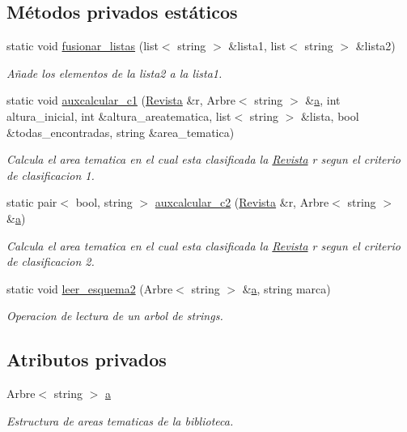 \subsection*{Métodos privados estáticos}
\begin{DoxyCompactItemize}
\item 
static void \hyperlink{class_esquema_abf74b66701d3ab70316d8740cdd0bc25}{fusionar\-\_\-listas} (list$<$ string $>$ \&lista1, list$<$ string $>$ \&lista2)
\begin{DoxyCompactList}\small\item\em Añade los elementos de la lista2 a la lista1. \end{DoxyCompactList}\item 
static void \hyperlink{class_esquema_a77210c8349dc7dccbaa8224c2da4e50e}{auxcalcular\-\_\-c1} (\hyperlink{class_revista}{Revista} \&r, Arbre$<$ string $>$ \&\hyperlink{class_esquema_aee89f1d564d1951112b2f10a47f943aa}{a}, int altura\-\_\-inicial, int \&altura\-\_\-areatematica, list$<$ string $>$ \&lista, bool \&todas\-\_\-encontradas, string \&area\-\_\-tematica)
\begin{DoxyCompactList}\small\item\em Calcula el area tematica en el cual esta clasificada la \hyperlink{class_revista}{Revista} r segun el criterio de clasificacion 1. \end{DoxyCompactList}\item 
static pair$<$ bool, string $>$ \hyperlink{class_esquema_a1e863b6bd93430abe836d339bd7bcba7}{auxcalcular\-\_\-c2} (\hyperlink{class_revista}{Revista} \&r, Arbre$<$ string $>$ \&\hyperlink{class_esquema_aee89f1d564d1951112b2f10a47f943aa}{a})
\begin{DoxyCompactList}\small\item\em Calcula el area tematica en el cual esta clasificada la \hyperlink{class_revista}{Revista} r segun el criterio de clasificacion 2. \end{DoxyCompactList}\item 
static void \hyperlink{class_esquema_acdc1f43dae72e916d6baf7f53f973a21}{leer\-\_\-esquema2} (Arbre$<$ string $>$ \&\hyperlink{class_esquema_aee89f1d564d1951112b2f10a47f943aa}{a}, string marca)
\begin{DoxyCompactList}\small\item\em Operacion de lectura de un arbol de strings. \end{DoxyCompactList}\end{DoxyCompactItemize}
\subsection*{Atributos privados}
\begin{DoxyCompactItemize}
\item 
Arbre$<$ string $>$ \hyperlink{class_esquema_aee89f1d564d1951112b2f10a47f943aa}{a}
\begin{DoxyCompactList}\small\item\em Estructura de areas tematicas de la biblioteca. \end{DoxyCompactList}\end{DoxyCompactItemize}


